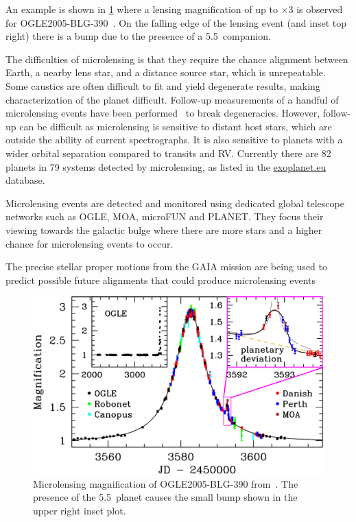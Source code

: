 An example is shown in \cref{fig:microlensing_example} where a lensing magnification of up to $\times3$ is observed for {OGLE2005-BLG-390}~\citep{beaulieu_discovery_2006}.
On the falling edge of the lensing event (and inset top right) there is a bump due to the presence of a 5.5\,\Mjup{} companion.

The difficulties of microlensing is that they require the chance alignment between Earth, a nearby lens star, and a distance source star, which is unrepeatable.
Some caustics are often difficult to fit and yield degenerate results, making characterization of the planet difficult.
Follow-up measurements of a handful of microlensing events have been performed~\citep[e.g.][]{kubas_frozen_2012, batista_confirmation_2015, santerne_spectroscopic_2016} to break degeneracies.
However, follow-up can be difficult as microlensing is sensitive to distant host stars, which are outside the ability of current spectrographs.
It is also sensitive to planets with a wider orbital separation compared to transits and {RV}.
Currently there are 82 planets in 79 systems detected by microlensing, as listed in the \href{https:\\www.exoplanet.eu}{exoplanet.eu} database.

Microlensing events are detected and monitored using dedicated global telescope networks such as {OGLE}, {MOA}, {microFUN} and {PLANET}.
They focus their viewing towards the galactic bulge where there are more stars and a higher chance for microlensing events to occur.

The precise stellar proper motions from the GAIA mission are being used to predict possible future alignments that could produce microlensing events~\citep{kluter_prediction_2018}

\begin{figure}
    \centering
    \includegraphics[width=0.5\linewidth]{./figures/introduction/Microlensing_OGLE2005-BLG-390.pdf}
    \caption[Microlensing magnification of OGLE2005-BLG-390.]{Microlensing magnification of OGLE2005-BLG-390 from~\citep{beaulieu_discovery_2006}.
    The presence of the 5.5\,\Mjup{} planet causes the small bump shown in the upper right inset plot.}
    \label{fig:microlensing_example}
\end{figure}

